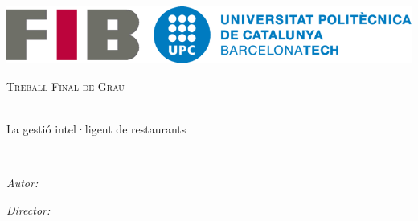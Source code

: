\documentclass[
11pt, %
catalan,
english,
spanish,
singlespacing, %
headsepline, %
]{MastersDoctoralThesis} %
\date{\displaydate{date}}
\author{Albert Suàrez} %
\begin{document}

\frontmatter %

\pagestyle{plain} %


\begin{titlepage}
\begin{center}

\includegraphics[scale=0.25]{Figures/logo-upc.png} %

\vspace*{.06\textheight}
{\scshape\LARGE \univname\par}\vspace{1.5cm} %
\textsc{\Large Treball Final de Grau}\\[0.5cm] %

\HRule \\[0.4cm] %
{\huge \bfseries \ttitle\par}\vspace{0.4cm} %
{\large La gestió intel·ligent de restaurants\par}\vspace{0.1cm} %
\HRule \\[1.5cm] %
 
\begin{minipage}[t]{0.4\textwidth}
\begin{flushleft} \large
\emph{Autor:}\\
\authorname %
\end{flushleft}
\end{minipage}
\begin{minipage}[t]{0.4\textwidth}
\begin{flushright} \large
\emph{Director:} \\
\supname %
\end{flushright}
\end{minipage}\\[3cm]
 

\end{center}
\end{titlepage}
\end{document}

